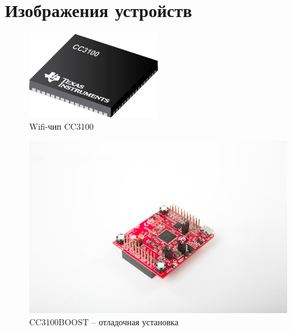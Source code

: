 \chapter{Изображения устройств}
\label{cha:appendix1}

\begin{figure}[!ht]
    \centering
    \includegraphics[width=0.5\textwidth]{figures/CC3100}
    \caption{Wifi-чип CC3100}
    \label{apx:cc3100}
\end{figure}

\begin{figure}[!ht]
    \centering
    \includegraphics[width=\textwidth]{figures/CC3100BOOST}
    \caption{CC3100BOOST -- отладочная установка}
    \label{apx:cc3100boost}
\end{figure}

